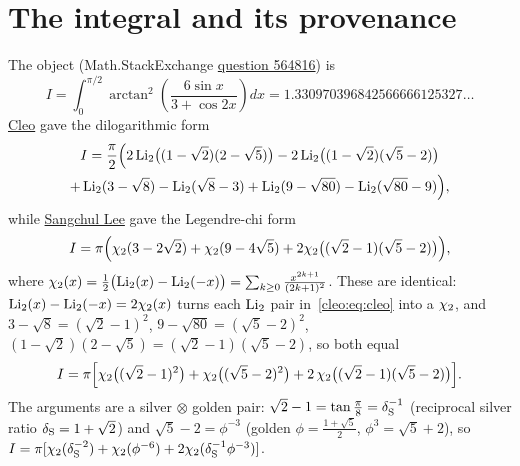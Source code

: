 \section{The integral and its provenance}
The object (Math.StackExchange \href{https://math.stackexchange.com/q/564816}{question 564816}) is
\begin{equation}\label{cleo:eq:I}
  I=\int_0^{\pi/2}\arctan^2\!\left(\frac{6\sin x}{3+\cos2x}\right)dx=1.330970396842566666125327\ldots
\end{equation}
\href{https://math.stackexchange.com/a/570815}{Cleo} gave the dilogarithmic form
\begin{multline}\label{cleo:eq:cleo}
  I=\frac{\pi}{2}\Bigl(2\operatorname{Li}_2\bigl((1-\sqrt2)(2-\sqrt5)\bigr)-2\operatorname{Li}_2\bigl((1-\sqrt2)(\sqrt5-2)\bigr)\\
  +\operatorname{Li}_2(3-\sqrt8)-\operatorname{Li}_2(\sqrt8-3)+\operatorname{Li}_2(9-\sqrt{80})-\operatorname{Li}_2(\sqrt{80}-9)\Bigr),
\end{multline}
while \href{https://math.stackexchange.com/a/571079}{Sangchul Lee} gave the Legendre-chi form
\begin{equation}\label{cleo:eq:lee}
  I=\pi\Bigl(\chi_2(3-2\sqrt2)+\chi_2(9-4\sqrt5)+2\chi_2\bigl((\sqrt2-1)(\sqrt5-2)\bigr)\Bigr),
\end{equation}
where $\chi_2(x)=\tfrac12\bigl(\operatorname{Li}_2(x)-\operatorname{Li}_2(-x)\bigr)=\sum_{k\ge0}\frac{x^{2k+1}}{(2k+1)^2}$. These are
identical: $\operatorname{Li}_2(x)-\operatorname{Li}_2(-x)=2\chi_2(x)$ turns each $\operatorname{Li}_2$ pair in~\eqref{cleo:eq:cleo} into a $\chi_2$, and
$3-\sqrt8=(\sqrt2-1)^2$, $9-\sqrt{80}=(\sqrt5-2)^2$, $(1-\sqrt2)(2-\sqrt5)=(\sqrt2-1)(\sqrt5-2)$, so both
equal
\begin{equation}\label{cleo:eq:canon}
  I=\pi\Bigl[\chi_2\bigl((\sqrt2-1)^2\bigr)+\chi_2\bigl((\sqrt5-2)^2\bigr)
  +2\,\chi_2\bigl((\sqrt2-1)(\sqrt5-2)\bigr)\Bigr].
\end{equation}
The arguments are a silver$\,\otimes\,$golden pair: $\sqrt2-1=\tan\frac\pi8=\delta_{\mathrm S}^{-1}$ (reciprocal silver
ratio $\delta_{\mathrm S}=1+\sqrt2$) and $\sqrt5-2=\phi^{-3}$ (golden $\phi=\tfrac{1+\sqrt5}2$, $\phi^3=\sqrt5+2$), so
$I=\pi[\chi_2(\delta_{\mathrm S}^{-2})+\chi_2(\phi^{-6})+2\chi_2(\delta_{\mathrm S}^{-1}\phi^{-3})]$.

